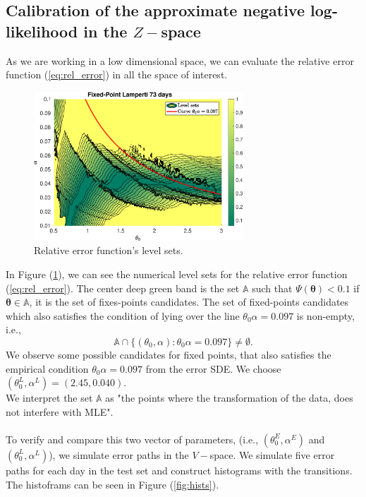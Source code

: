 \documentclass[11pt]{article}
\theoremstyle{definition}
\begin{document}
\subsection{Calibration of the approximate negative log-likelihood in the $Z-$space}

As we are working in a low dimensional space, we can evaluate the relative error function (\ref{eq:rel_error}) in all the space of interest.

\begin{figure}[H]
\centering
\includegraphics[width=0.7\textwidth]{../../MATLAB_Files/Results/likelihood/lamperti/Log-Likelihood.eps}
\caption{Relative error function's level sets.}
\label{fig:neg-LLL}
\end{figure}
In Figure (\ref{fig:neg-LLL}), we can see the numerical level sets for the relative error function (\ref{eq:rel_error}). The center deep green band is the set $\mathbb{A}$ such that $\Psi(\bm{\theta})<0.1$ if $\bm{\theta}\in\mathbb{A}$, it is the set of fixes-points candidates. The set of fixed-points candidates which also satisfies the condition of lying over the line $\theta_0\alpha=0.097$ is non-empty, i.e., $$\mathbb{A}\cap\{(\theta_0,\alpha):\theta_0\alpha=0.097\}\neq\emptyset.$$
We observe some possible candidates for fixed points, that also satisfies the empirical condition $\theta_0\alpha=0.097$ from the error SDE. We choose $(\theta_0^L,\alpha^L)=(2.45,0.040)$.\\
{\color{red}We interpret the set $\mathbb{A}$ as "the points where the transformation of the data, does not interfere with MLE".}\\
\quad\\
To verify and compare this two vector of parameters, (i.e., $(\theta_0^E,\alpha^E)$ and $(\theta_0^L,\alpha^L)$), we simulate error paths in the $V-$space. We simulate five error paths for each day in the test set and construct histograms with the transitions. The histoframs can be seen in Figure (\ref{fig:hists}).
\end{document}
